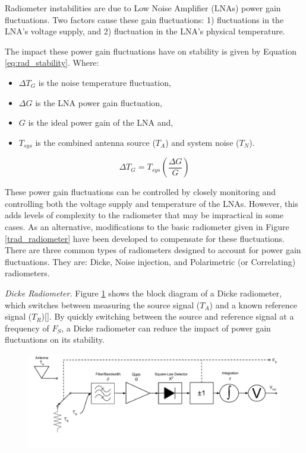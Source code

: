 Radiometer instabilities are due to Low Noise Amplifier (LNAs) power gain fluctuations.  Two factors cause these gain fluctuations: 1) fluctuations in the LNA's voltage supply, and 2) fluctuation in the LNA's physical temperature.  

The impact these power gain fluctuations have on stability is given by Equation \ref{eq:rad_stability}.  Where:

\begin{itemize}
\item $\Delta T_G$ is the noise temperature fluctuation,
\item $\Delta G$ is the LNA power gain fluctuation,
\item $G$ is the ideal power gain of the LNA and,
\item $T_{sys}$ is the combined antenna source ($T_A$) and system noise ($T_N$).
\end{itemize}

\begin{equation} \label{eq:rad_stability}
\Delta T_G=T_{sys} \left(\frac{\Delta G}{G}\right)
\end{equation}

These power gain fluctuations can be controlled by closely monitoring and controlling both the voltage supply and temperature of the LNAs. However, this adds levels of complexity to the radiometer that may be impractical in some cases.  As an alternative, modifications to the basic radiometer given in Figure \ref{trad_radiometer} have been developed to compensate for these fluctuations.  There are three common types of radiometers designed to account for power gain fluctuations.  They are: Dicke, Noise injection, and Polarimetric (or Correlating) radiometers.

\emph{Dicke Radiometer.}  Figure \ref{dicke_radiometer} shows the block diagram of a Dicke radiometer, which switches between measuring the source signal ($T_A$) and a known reference signal ($T_R$)[\cite{Dicke}].  By quickly switching between the source and reference signal at a frequency of $F_S$, a Dicke radiometer can reduce the impact of power gain fluctuations on its stability.  

{\begin{figure}[h!tb] 
\centering
\includegraphics[width=\textwidth]{Images/Dicke_Radiometer.pdf}
\label{dicke_radiometer}
\end{figure}
}

